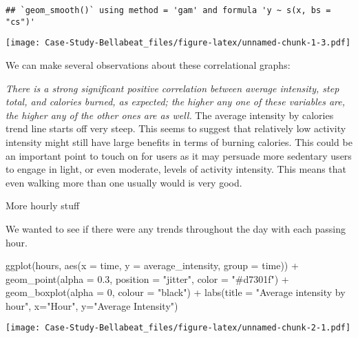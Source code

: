 \documentclass[
]{article}
\newenvironment{Shaded}{\begin{snugshade}}{\end{snugshade}}
\newcommand{\AttributeTok}[1]{\textcolor[rgb]{0.77,0.63,0.00}{#1}}
\newcommand{\DecValTok}[1]{\textcolor[rgb]{0.00,0.00,0.81}{#1}}
\newcommand{\FloatTok}[1]{\textcolor[rgb]{0.00,0.00,0.81}{#1}}
\newcommand{\FunctionTok}[1]{\textcolor[rgb]{0.00,0.00,0.00}{#1}}
\newcommand{\NormalTok}[1]{#1}
\newcommand{\SpecialCharTok}[1]{\textcolor[rgb]{0.00,0.00,0.00}{#1}}
\newcommand{\StringTok}[1]{\textcolor[rgb]{0.31,0.60,0.02}{#1}}
\begin{document}
\begin{verbatim}
## `geom_smooth()` using method = 'gam' and formula 'y ~ s(x, bs = "cs")'
\end{verbatim}

\texttt{[image: Case-Study-Bellabeat\_files/figure-latex/unnamed-chunk-1-3.pdf]}

We can make several observations about these correlational graphs:

\emph{There is a strong significant positive correlation between average
intensity, step total, and calories burned, as expected; the higher any
one of these variables are, the higher any of the other ones are as
well. }The average intensity by calories trend line starts off very
steep. This seems to suggest that relatively low activity intensity
might still have large benefits in terms of burning calories. This could
be an important point to touch on for users as it may persuade more
sedentary users to engage in light, or even moderate, levels of activity
intensity. This means that even walking more than one usually would is
very good.

More hourly stuff

We wanted to see if there were any trends throughout the day with each
passing hour.

\begin{Shaded}
\begin{Highlighting}[]
\FunctionTok{ggplot}\NormalTok{(hours, }\FunctionTok{aes}\NormalTok{(}\AttributeTok{x =}\NormalTok{ time, }\AttributeTok{y =}\NormalTok{ average\_intensity, }\AttributeTok{group =}\NormalTok{ time)) }\SpecialCharTok{+}
  \FunctionTok{geom\_point}\NormalTok{(}\AttributeTok{alpha =} \FloatTok{0.3}\NormalTok{, }\AttributeTok{position =} \StringTok{"jitter"}\NormalTok{, }\AttributeTok{color =} \StringTok{"\#d7301f"}\NormalTok{) }\SpecialCharTok{+}
  \FunctionTok{geom\_boxplot}\NormalTok{(}\AttributeTok{alpha =} \DecValTok{0}\NormalTok{, }\AttributeTok{colour =} \StringTok{"black"}\NormalTok{) }\SpecialCharTok{+}
  \FunctionTok{labs}\NormalTok{(}\AttributeTok{title =} \StringTok{"Average intensity by hour"}\NormalTok{, }\AttributeTok{x=}\StringTok{"Hour"}\NormalTok{, }\AttributeTok{y=}\StringTok{"Average Intensity"}\NormalTok{)}
\end{Highlighting}
\end{Shaded}

\texttt{[image: Case-Study-Bellabeat\_files/figure-latex/unnamed-chunk-2-1.pdf]}
\end{document}
